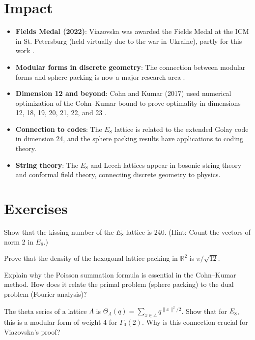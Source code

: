 \section{Impact}

\begin{itemize}
\item \textbf{Fields Medal (2022)}: Viazovska was awarded the Fields Medal at the ICM in St. Petersburg (held virtually due to the war in Ukraine), partly for this work \cite{fields2022}.
\item \textbf{Modular forms in discrete geometry}: The connection between modular forms and sphere packing is now a major research area \cite{viazovska2017, cohn2017}.
\item \textbf{Dimension 12 and beyond}: Cohn and Kumar (2017) used numerical optimization of the Cohn--Kumar bound to prove optimality in dimensions 12, 18, 19, 20, 21, 22, and 23 \cite{cohn2017b}.
\item \textbf{Connection to codes}: The $E_8$ lattice is related to the extended Golay code in dimension 24, and the sphere packing results have applications to coding theory.
\item \textbf{String theory}: The $E_8$ and Leech lattices appear in bosonic string theory and conformal field theory, connecting discrete geometry to physics.
\end{itemize}

\section{Exercises}

\begin{exercise}[Basic]
Show that the kissing number of the $E_8$ lattice is 240. (Hint: Count the vectors of norm 2 in $E_8$.) \cite{conway1999}
\end{exercise}

\begin{exercise}[Intermediate]
Prove that the density of the hexagonal lattice packing in $\mathbb{R}^2$ is $\pi/\sqrt{12}$. \cite{thue1910}
\end{exercise}

\begin{exercise}[Challenge]
Explain why the Poisson summation formula is essential in the Cohn--Kumar method. How does it relate the primal problem (sphere packing) to the dual problem (Fourier analysis)? \cite{cohn2003}
\end{exercise}

\begin{exercise}
The theta series of a lattice $\Lambda$ is $\Theta_\Lambda(q) = \sum_{x \in \Lambda} q^{\|x\|^2/2}$. Show that for $E_8$, this is a modular form of weight 4 for $\Gamma_0(2)$. Why is this connection crucial for Viazovska's proof? \cite{viazovska2017}
\end{exercise}


